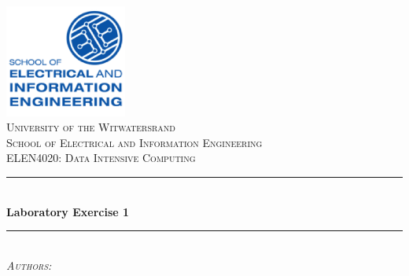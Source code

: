 \documentclass[10pt,twocolumn]{witseiepaper}
\begin{document}
	
\begin{titlepage}
	
	\newcommand{\HRule}{\rule{\linewidth}{0.3mm}} %
	
	\center %
	
		\includegraphics[width=0.3\textwidth]{EIE.png}\\[1cm] %
	
	\textsc{\LARGE University of the Witwatersrand } \\[0.1cm] %
	\textsc{\LARGE School of Electrical and Information Engineering }\\[1cm] %
	\textsc{\Large ELEN4020: Data Intensive Computing}\\[1.5cm] %
	
	
	\HRule \\[0.4cm]
	{ \huge \bfseries Laboratory Exercise 1} \\[0.4cm] %
		\HRule \\[1.5cm]

\textsc{\Large 	\emph{Authors:} } \\[0.1cm]	 



\end{titlepage}
\end{document}
